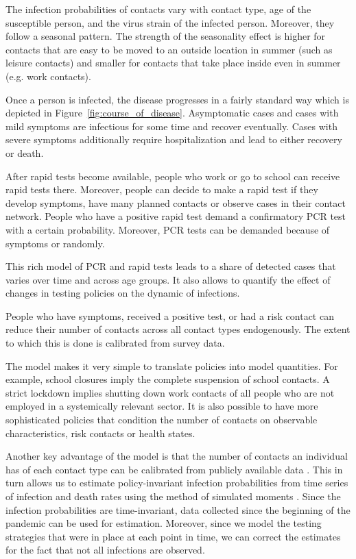 The infection probabilities of contacts vary with contact type, age of the susceptible
person, and the virus strain of the infected person. Moreover, they follow a seasonal
pattern. The strength of the seasonality effect is higher for contacts that are easy to
be moved to an outside location in summer (such as leisure contacts) and smaller for
contacts that take place inside even in summer (e.g. work contacts).

Once a person is infected, the disease progresses in a fairly standard way which is
depicted in Figure~\ref{fig:course_of_disease}. Asymptomatic cases and cases with mild
symptoms are infectious for some time and recover eventually. Cases with severe symptoms
additionally require hospitalization and lead to either recovery or death.

After rapid tests become available, people who work or go to school can receive rapid
tests there. Moreover, people can decide to make a rapid test if they develop symptoms,
have many planned contacts or observe cases in their contact network. People who have a positive rapid test demand a confirmatory PCR test with a certain
probability. Moreover, PCR tests can be demanded because of symptoms or randomly.

This rich model of PCR and rapid tests leads to a share of detected cases that varies
over time and across age groups. It also allows to quantify the effect of changes in
testing policies on the dynamic of infections.

People who have symptoms, received a positive test, or had a risk contact
can reduce their number of contacts across all contact types endogenously. The extent to
which this is done is calibrated from survey data.

The model makes it very simple to translate policies into model quantities. For example,
school closures imply the complete suspension of school contacts. A strict lockdown
implies shutting down work contacts of all people who are not employed in a systemically
relevant sector. It is also possible to have more sophisticated policies that condition
the number of contacts on observable characteristics, risk contacts or health states.

Another key advantage of the model is that the number of contacts an individual has of
each contact type can be calibrated from publicly available data \citep{Mossong2008}.
This in turn allows us to estimate policy-invariant infection probabilities from time
series of infection and death rates using the method of simulated moments
\citep{McFadden1989}. Since the infection probabilities are time-invariant, data
collected since the beginning of the pandemic can be used for estimation. Moreover,
since we model the testing strategies that were in place at each point in time, we can
correct the estimates for the fact that not all infections are observed.

